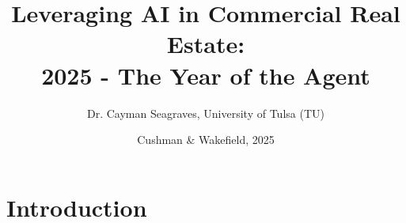 \documentclass{beamer}
\author{Dr. Cayman Seagraves, University of Tulsa (TU)}
\date{Cushman \& Wakefield, 2025}
\title{Leveraging AI in Commercial Real Estate: \\ 2025 - The Year of the Agent\\}
\begin{document}
{
\begin{frame}
    \titlepage
\end{frame}
}


                
\section{Introduction}
\end{document}
